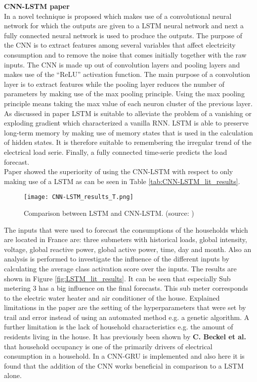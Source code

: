 \textbf{CNN-LSTM paper}\\
In \cite{Kim2019} a novel technique is proposed which makes use of a convolutional neural network for which the outputs are given to a LSTM neural network and next a fully connected neural network  is used to produce the outputs. The purpose of the CNN is to extract features among several variables that affect electricity consumption and to remove the noise that comes initially together with the raw inputs. The CNN is made up out of convolution layers and pooling layers and makes use of the ``ReLU'' activation function. The main purpose of a convolution layer is to extract features while the pooling layer reduces the number of parameters by making use of the max pooling principle. Using the max pooling principle means taking the max value of each neuron cluster of the previous layer. As discussed in paper \cite{Kong2019} LSTM is suitable to alleviate the problem of a vanishing or exploding gradient which characterized a vanilla RNN. LSTM is able to preserve long-term memory by making use of memory states that is used in the calculation of hidden states. It is therefore suitable to remembering the irregular trend of the electrical load serie. Finally, a fully connected time-serie predicts the load forecast.\\
Paper \cite{Kim2019} showed the superiority of using the CNN-LSTM with respect to only making use of a LSTM as can be seen in Table \ref{tab:CNN-LSTM_lit_results}. 

\begin{figure}[h!]
	\centering
	\texttt{[image: CNN-LSTM\_results\_T.png]}
	\caption{Comparison between LSTM and CNN-LSTM. (source: \cite{Kim2019})}
	\label{tab:LSTM_lit_results}
\end{figure}

The inputs that were used to forecast the consumptions of the households which are located in France are: three submeters with historical loads, global intensity, voltage, global reactive power, global active power, time, day and month. 
Also an analysis is performed to investigate the influence of the different inputs by calculating the average class activation score over the inputs. The results are shown in Figure \ref{fig:LSTM_lit_results}. It can be seen that especially Sub metering $ 3 $ has a big influence on the final forecasts. This sub meter corresponds to the electric water heater and air conditioner of the house. Explained limitations in the paper are the setting of the hyperparameters that were set by trail and error instead of using an automated method e.g. a genetic algorithm. A further limitation is the lack of household characteristics e.g. the amount of residents living in the house. It has previously been shown by \textbf{C. Beckel et al.} that household occupancy is one of the primarily drivers of electrical consumption in a household. In \cite{Sajjad2020} a CNN-GRU is implemented and also here it is found that the addition of the CNN works beneficial in comparison to a LSTM alone.\\

